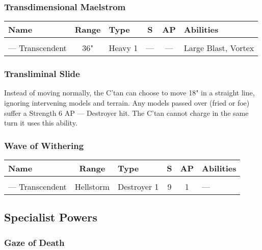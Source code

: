 \subsubsection{Transdimensional Maelstrom} \label{Transdimensional Maelstrom}

\noindent
\begin{NiceTabular}{L{115 pt} c C{40pt} *{2}{c} >{\raggedright\arraybackslash}p{240pt}}
	Name & Range & Type & S & AP & Abilities \\
	\hline
	 &  &  &  &  & \\
	— Transcendent & 36" & Heavy 1 & — & — & Large Blast, Vortex \\
\end{NiceTabular}

\subsubsection{Transliminal Slide} \label{Transliminal Slide}

Instead of moving normally, the C'tan can choose to move 18" in a straight line, ignoring intervening models and terrain. Any models passed over (fried or foe) suffer a Strength 6 AP — Destroyer hit. The C'tan cannot charge in the same turn it uses this ability.

\subsubsection{Wave of Withering} \label{Wave of Withering}

\noindent
\begin{NiceTabular}{L{115 pt} c C{40pt} *{2}{c} >{\raggedright\arraybackslash}p{240pt}}
	Name & Range & Type & S & AP & Abilities \\
	\hline
	 &  &  &  &  & \\
	— Transcendent & Hellstorm & Destroyer 1 & 9 & 1 & — \\
\end{NiceTabular}

\subsection{Specialist Powers}

\subsubsection{Gaze of Death} \label{Gaze of Death}

